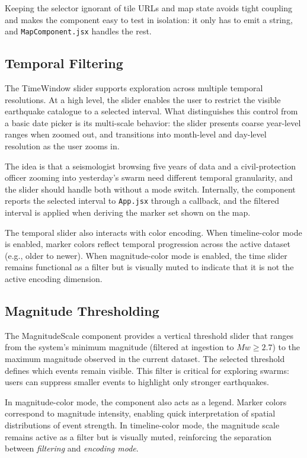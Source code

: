 \documentclass[12pt]{article}
\begin{document}
Keeping the selector ignorant of tile URLs and map state avoids tight coupling and makes the component easy to test in isolation: it only has to emit a string, and \texttt{MapComponent.jsx} handles the rest.

\subsection{Temporal Filtering}
\label{subsec:frontend_timewindow}

The TimeWindow slider supports exploration across multiple temporal resolutions. At a high level, the slider enables the user to restrict the visible earthquake catalogue to a selected interval. What distinguishes this control from a basic date picker is its multi-scale behavior: the slider presents coarse year-level ranges when zoomed out, and transitions into month-level and day-level resolution as the user zooms in.

The idea is that a seismologist browsing five years of data and a civil-protection officer zooming into yesterday's swarm need different temporal granularity, and the slider should handle both without a mode switch. Internally, the component reports the selected interval to \texttt{App.jsx} through a callback, and the filtered interval is applied when deriving the marker set shown on the map.

The temporal slider also interacts with color encoding. When timeline-color mode is enabled, marker colors reflect temporal progression across the active dataset (e.g., older to newer). When magnitude-color mode is enabled, the time slider remains functional as a filter but is visually muted to indicate that it is not the active encoding dimension.

\subsection{Magnitude Thresholding}
\label{subsec:frontend_magnitude}

The MagnitudeScale component provides a vertical threshold slider that ranges from the system’s minimum magnitude (filtered at ingestion to $Mw \geq 2.7$) to the maximum magnitude observed in the current dataset. The selected threshold defines which events remain visible. This filter is critical for exploring swarms: users can suppress smaller events to highlight only stronger earthquakes.

In magnitude-color mode, the component also acts as a legend. Marker colors correspond to magnitude intensity, enabling quick interpretation of spatial distributions of event strength. In timeline-color mode, the magnitude scale remains active as a filter but is visually muted, reinforcing the separation between \emph{filtering} and \emph{encoding mode}.
\end{document}
